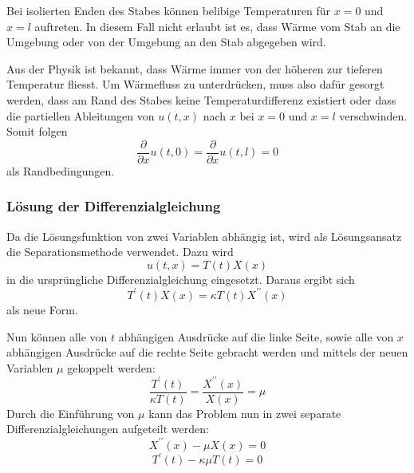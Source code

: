 Bei isolierten Enden des Stabes können belibige Temperaturen für $x = 0$ und
$x = l$ auftreten. In diesem Fall nicht erlaubt ist es, dass Wärme vom Stab
an die Umgebung oder von der Umgebung an den Stab abgegeben wird.

Aus der Physik ist bekannt, dass Wärme immer von der höheren zur tieferen
Temperatur fliesst. Um Wärmefluss zu unterdrücken, muss also dafür gesorgt
werden, dass am Rand des Stabes keine Temperaturdifferenz existiert oder 
dass die partiellen Ableitungen von $u(t,x)$ nach $x$ bei $x = 0$ und $x = l$
verschwinden.
Somit folgen
\begin{equation}
    \label{eq:slp-example-fourier-boundary-condition-ends-isolated}
    \frac{\partial}{\partial x} u(t, 0)
    =
    \frac{\partial}{\partial x} u(t, l)
    =
    0
\end{equation}
als Randbedingungen.


\subsubsection{Lösung der Differenzialgleichung}


Da die Lösungsfunktion von zwei Variablen abhängig ist, wird als Lösungsansatz
die Separationsmethode verwendet.
Dazu wird 
\[
    u(t,x)
    =
    T(t)X(x)
\]
in die ursprüngliche Differenzialgleichung eingesetzt.
Daraus ergibt sich 
\[
    T^{\prime}(t)X(x)
    =
    \kappa T(t)X^{\prime \prime}(x)
\]
als neue Form.

Nun können alle von $t$ abhängigen Ausdrücke auf die linke Seite, sowie alle
von $x$ abhängigen Ausdrücke auf die rechte Seite gebracht werden und mittels
der neuen Variablen $\mu$ gekoppelt werden:
\begin{equation}
    \frac{T^{\prime}(t)}{\kappa T(t)}
    =
    \frac{X^{\prime \prime}(x)}{X(x)}
    =
    \mu
\end{equation}
Durch die Einführung von $\mu$ kann das Problem nun in zwei separate
Differenzialgleichungen aufgeteilt werden:
\begin{equation}
    \label{eq:slp-example-fourier-separated-x}
    X^{\prime \prime}(x) - \mu X(x)
    =
    0
\end{equation}
\begin{equation}
    \label{eq:slp-example-fourier-separated-t}
    T^{\prime}(t) - \kappa \mu T(t)
    =
    0
\end{equation}

